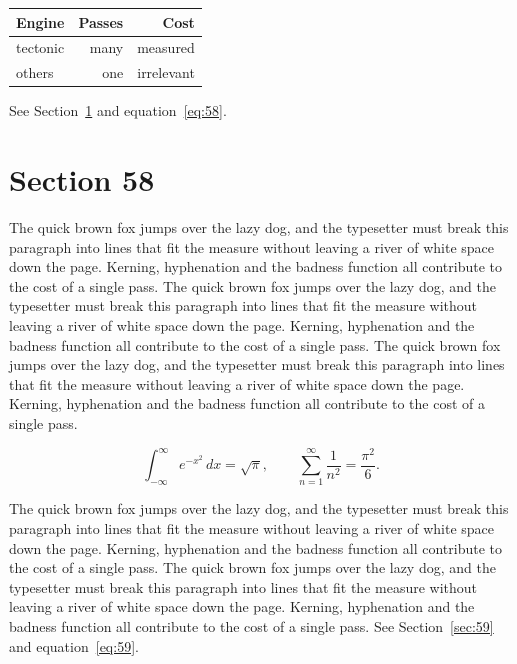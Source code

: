 \documentclass{article}
\begin{document}
\begin{center}
\begin{tabular}{lrr}
\toprule
Engine & Passes & Cost \\
\midrule
tectonic & many & measured \\
others & one & irrelevant \\
\bottomrule
\end{tabular}
\end{center}

See Section~\ref{sec:58} and equation~\eqref{eq:58}.
\section{Section 58}
\label{sec:58}
The quick brown fox jumps over the lazy dog, and the typesetter must break this paragraph into lines that fit the measure without leaving a river of white space down the page. Kerning, hyphenation and the badness function all contribute to the cost of a single pass. The quick brown fox jumps over the lazy dog, and the typesetter must break this paragraph into lines that fit the measure without leaving a river of white space down the page. Kerning, hyphenation and the badness function all contribute to the cost of a single pass. The quick brown fox jumps over the lazy dog, and the typesetter must break this paragraph into lines that fit the measure without leaving a river of white space down the page. Kerning, hyphenation and the badness function all contribute to the cost of a single pass. 

\begin{equation}\label{eq:58}
\int_{-\infty}^{\infty} e^{-x^{2}}\,dx = \sqrt{\pi}, \qquad
\sum_{n=1}^{\infty} \frac{1}{n^{2}} = \frac{\pi^{2}}{6}.
\end{equation}

The quick brown fox jumps over the lazy dog, and the typesetter must break this paragraph into lines that fit the measure without leaving a river of white space down the page. Kerning, hyphenation and the badness function all contribute to the cost of a single pass. The quick brown fox jumps over the lazy dog, and the typesetter must break this paragraph into lines that fit the measure without leaving a river of white space down the page. Kerning, hyphenation and the badness function all contribute to the cost of a single pass. 
See Section~\ref{sec:59} and equation~\eqref{eq:59}.
\end{document}
